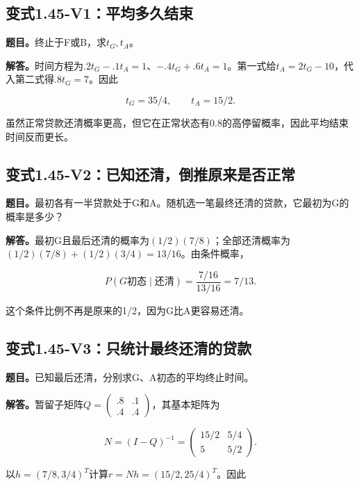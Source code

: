 \documentclass[
  11pt,
  a4paper,
  UTF8,
  fontset=fandol]{ctexart}
\begin{document}
\subsection{变式1.45-V1：平均多久结束}\label{ux53d8ux5f0f1.45-v1ux5e73ux5747ux591aux4e45ux7ed3ux675f}

\textbf{题目。}终止于F或B，求\(t_G,t_A\)。

\textbf{解答。}时间方程为\(.2t_G-.1t_A=1\)、\(-.4t_G+.6t_A=1\)。第一式给\(t_A=2t_G-10\)，代入第二式得\(.8t_G=7\)。因此

\[
\boxed{t_G=35/4,\qquad t_A=15/2.}
\]

虽然正常贷款还清概率更高，但它在正常状态有0.8的高停留概率，因此平均结束时间反而更长。

\subsection{变式1.45-V2：已知还清，倒推原来是否正常}\label{ux53d8ux5f0f1.45-v2ux5df2ux77e5ux8fd8ux6e05ux5012ux63a8ux539fux6765ux662fux5426ux6b63ux5e38}

\textbf{题目。}最初各有一半贷款处于G和A。随机选一笔最终还清的贷款，它最初为G的概率是多少？

\textbf{解答。}最初G且最后还清的概率为\((1/2)(7/8)\)；全部还清概率为\((1/2)(7/8)+(1/2)(3/4)=13/16\)。由条件概率，

\[
\boxed{P(G\text{初态}\mid\text{还清})=\frac{7/16}{13/16}=7/13.}
\]

这个条件比例不再是原来的1/2，因为G比A更容易还清。

\subsection{变式1.45-V3：只统计最终还清的贷款}\label{ux53d8ux5f0f1.45-v3ux53eaux7edfux8ba1ux6700ux7ec8ux8fd8ux6e05ux7684ux8d37ux6b3e}

\textbf{题目。}已知最后还清，分别求G、A初态的平均终止时间。

\textbf{解答。}暂留子矩阵\(Q=\left(\begin{smallmatrix}.8&.1\\.4&.4\end{smallmatrix}\right)\)，其基本矩阵为

\[
N=(I-Q)^{-1}=\begin{pmatrix}15/2&5/4\\5&5/2\end{pmatrix}.
\]

以\(h=(7/8,3/4)^T\)计算\(r=Nh=(15/2,25/4)^T\)。因此
\end{document}
